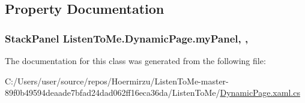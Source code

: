\subsection{Property Documentation}
\subsubsection[{\texorpdfstring{my\+Panel}{myPanel}}]{\setlength{\rightskip}{0pt plus 5cm}Stack\+Panel Listen\+To\+Me.\+Dynamic\+Page.\+my\+Panel\hspace{0.3cm}{\ttfamily [get]}, {\ttfamily [set]}, {\ttfamily [private]}}\hypertarget{class_listen_to_me_1_1_dynamic_page_a187c4aba2636c3956cf023f1dc3f86ec}{}\label{class_listen_to_me_1_1_dynamic_page_a187c4aba2636c3956cf023f1dc3f86ec}


The documentation for this class was generated from the following file\+:\begin{DoxyCompactItemize}
\item 
C\+:/\+Users/user/source/repos/\+Hoermirzu/\+Listen\+To\+Me-\/master-\/89f0b49594deaade7bfad24dad062ff16eca36da/\+Listen\+To\+Me/\hyperlink{_dynamic_page_8xaml_8cs}{Dynamic\+Page.\+xaml.\+cs}\end{DoxyCompactItemize}

